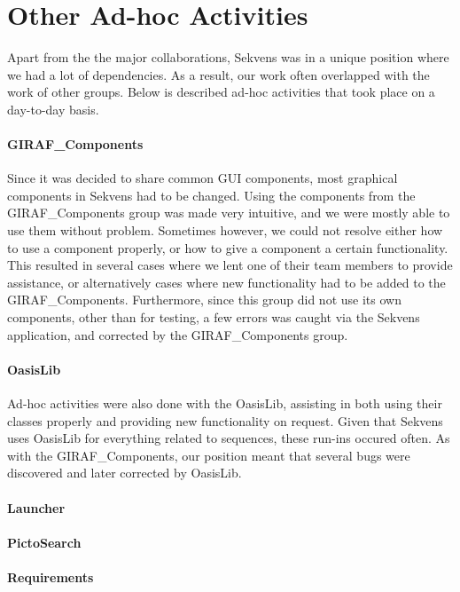 \section{Other Ad-hoc Activities}\label{sec:adhoc}
Apart from the the major collaborations, Sekvens was in a unique position where we had a lot of dependencies. As a result, our work often overlapped with the work of other groups. Below is described ad-hoc activities that took place on a day-to-day basis.

\paragraph{GIRAF\_Components}
Since it was decided to share common GUI components, most graphical components in Sekvens had to be changed. Using the components from the GIRAF\_Components group was made very intuitive, and we were mostly able to use them without problem. Sometimes however, we could not resolve either how to use a component properly, or how to give a component a certain functionality. This resulted in several cases where we lent one of their team members to provide assistance, or alternatively cases where new functionality had to be added to the GIRAF\_Components.  Furthermore, since this group did not use its own components, other than for testing, a few errors was caught via the Sekvens application, and corrected by the GIRAF\_Components group.

\paragraph{OasisLib}
Ad-hoc activities were also done with the OasisLib, assisting in both using their classes properly and providing new functionality on request. Given that Sekvens uses OasisLib for everything related to sequences, these run-ins occured often. As with the GIRAF\_Components, our position meant that several bugs were discovered and later corrected by OasisLib.

\paragraph{Launcher}

\paragraph{PictoSearch}

\paragraph{Requirements}